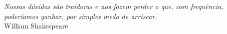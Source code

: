 
\chapter*{}
\vspace{15cm}
\begin{flushright}
	\textit
	{
		Nossas dúvidas são traidoras e nos fazem perder o que, com frequência, poderíamos ganhar, por simples medo de arriscar.
	}\medskip\\ 
	William Shakespeare
\end{flushright}